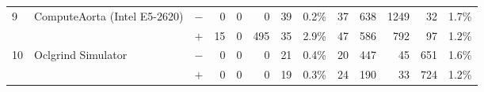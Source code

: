 \begin{tabular}{lll | rrrrr | rrrrr }
\hline
\multirow{ 2}{*}{9} & \multirow{ 2}{*}{ComputeAorta (Intel E5-2620)} & $-$ & 0 & 0 & 0 & 39 & 0.2\%       & 37 & 638 & 1249 & 32 & 1.7\% \\& & $+$ & 15 & 0 & 495 & 35 & 2.9\% & 47 & 586 & 792 & 97 & 1.2\% \\
\hline
\multirow{ 2}{*}{10} & \multirow{ 2}{*}{Oclgrind Simulator} & $-$ & 0 & 0 & 0 & 21 & 0.4\%       & 20 & 447 & 45 & 651 & 1.6\% \\& & $+$ & 0 & 0 & 0 & 19 & 0.3\% & 24 & 190 & 33 & 724 & 1.2\% \\
  \bottomrule
\end{tabular}

